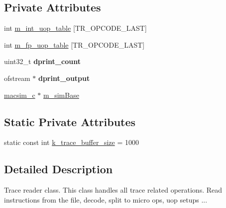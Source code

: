 \subsection*{Private Attributes}
\begin{DoxyCompactItemize}
\item 
int \hyperlink{classtrace__read__c_a7ca8b07aa548cbeac42c78fa5dcdc856}{m\_\-int\_\-uop\_\-table} \mbox{[}TR\_\-OPCODE\_\-LAST\mbox{]}
\item 
int \hyperlink{classtrace__read__c_a71e9a814021a699d19a3b61fdc53d9f4}{m\_\-fp\_\-uop\_\-table} \mbox{[}TR\_\-OPCODE\_\-LAST\mbox{]}
\item 
\hypertarget{classtrace__read__c_a447f055cd46c4894c8b6c67debaa70a4}{
uint32\_\-t {\bfseries dprint\_\-count}}
\label{classtrace__read__c_a447f055cd46c4894c8b6c67debaa70a4}

\item 
\hypertarget{classtrace__read__c_a8f95dd5961dceaf284795a7d5618cc82}{
ofstream $\ast$ {\bfseries dprint\_\-output}}
\label{classtrace__read__c_a8f95dd5961dceaf284795a7d5618cc82}

\item 
\hyperlink{classmacsim__c}{macsim\_\-c} $\ast$ \hyperlink{classtrace__read__c_a5056a52a94eb0fc5a3ab6e6ccb1d113b}{m\_\-simBase}
\end{DoxyCompactItemize}
\subsection*{Static Private Attributes}
\begin{DoxyCompactItemize}
\item 
static const int \hyperlink{classtrace__read__c_a8853b7e1571b86ffba1ee31b185d0e91}{k\_\-trace\_\-buffer\_\-size} = 1000
\end{DoxyCompactItemize}


\subsection{Detailed Description}
Trace reader class. This class handles all trace related operations. Read instructions from the file, decode, split to micro ops, uop setups ... 

